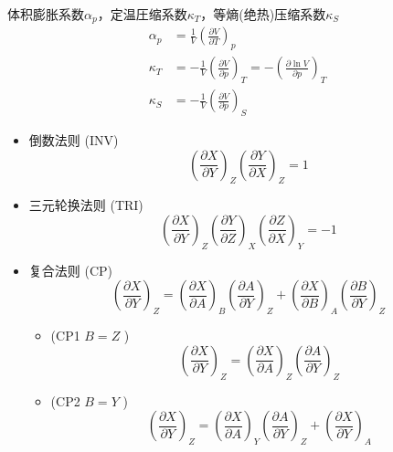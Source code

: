 \begin{lemma}
    体积膨胀系数\(\alpha_p\)，定温圧缩系数\(\kappa_T\)，等熵(绝热)压缩系数\(\kappa_S\)
    \begin{align*}
        \alpha_p &= \frac{1}{V} \left( \frac{\partial V}{\partial T} \right)_p \\
        \kappa_T &= -\frac{1}{V} \left( \frac{\partial V}{\partial p} \right)_T
        =-\left(\frac{\partial \ln V}{\partial p}\right)_T \\
        \kappa_S &= -\frac{1}{V} \left( \frac{\partial V}{\partial p} \right)_S
    \end{align*}
\end{lemma}
\begin{lemma}
\begin{itemize}
    偏导数之间的运算规则
    \item 倒数法则 (INV)
    \[
    \left( \frac{\partial X}{\partial Y} \right)_Z \left( \frac{\partial Y}{\partial X} \right)_Z = 1
    \]    
    \item 三元轮换法则 (TRI)
    \[
    \left( \frac{\partial X}{\partial Y} \right)_Z \left( \frac{\partial Y}{\partial Z} \right)_X \left( \frac{\partial Z}{\partial X} \right)_Y = -1
    \]
    \item 复合法则 (CP)
    \[
    \left( \frac{\partial X}{\partial Y} \right)_Z = \left( \frac{\partial X}{\partial A} \right)_B \left( \frac{\partial A}{\partial Y} \right)_Z + \left( \frac{\partial X}{\partial B} \right)_A \left( \frac{\partial B}{\partial Y} \right)_Z
    \]
    \begin{itemize}
        \item  (CP1 \( B = Z \) )
        \[
        \left( \frac{\partial X}{\partial Y} \right)_Z = \left( \frac{\partial X}{\partial A} \right)_Z \left( \frac{\partial A}{\partial Y} \right)_Z
        \]
        \item  (CP2 \( B = Y \) )
        \[
        \left( \frac{\partial X}{\partial Y} \right)_Z =  
        \left( \frac{\partial X}{\partial A} \right)_Y \left( \frac{\partial A}{\partial Y} \right)_Z
        +\left( \frac{\partial X}{\partial Y} \right)_A
        \]
    \end{itemize}
\end{itemize}
\end{lemma}
